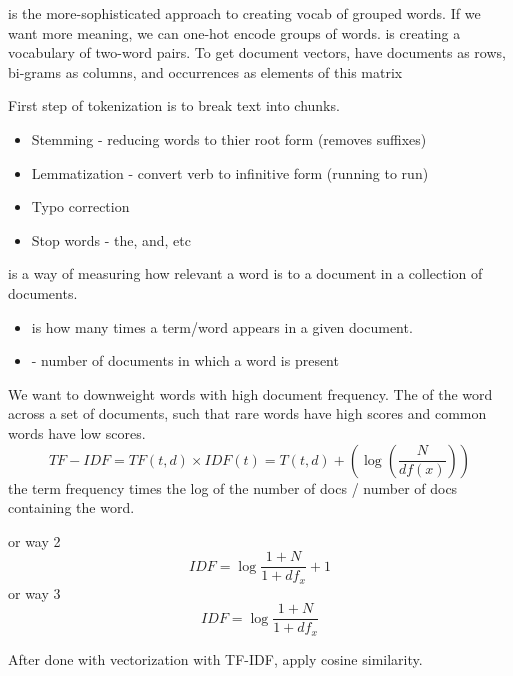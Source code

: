 \documentclass[12pt]{scrartcl}
\begin{document}
\begin{definition}
   is the more-sophisticated approach to creating vocab of grouped words. 
  If we want more meaning, we can one-hot encode groups of words.  is creating a vocabulary of 
  two-word pairs. To get document vectors, have documents as rows, bi-grams as columns, and occurrences as 
  elements of this matrix
\end{definition}

\begin{definition}
  First step of tokenization is to break text into chunks.
  \begin{itemize}
    \item Stemming - reducing words to thier root form (removes suffixes)
    \item Lemmatization - convert verb to infinitive form (running to run)
    \item Typo correction
    \item Stop words - the, and, etc
  \end{itemize}
\end{definition}

\begin{definition}
   is a way of measuring how relevant a word 
  is to a document in a collection of documents.
  \begin{itemize}
    \item {} is how many times a term/word appears in a given document.
    \item {} - number of documents in which a word is present 
  \end{itemize}
  We want to downweight words with high document frequency. The 
   of the word across a set of documents, such that 
  rare words have high scores and common words have low scores.
  \[TF-IDF = TF(t, d) \times IDF(t) = T(t, d) + (\log(\frac{N}{df(x)}))\]
  the term frequency times the log of the number of docs / number of docs containing the word.

  or way 2
  \[IDF = \log\frac{1 + N}{1 + df_x} + 1\]
  or way 3
  \[IDF = \log\frac{1 + N}{1 + df_x}\]
\end{definition}

\begin{note}
  After done with vectorization with TF-IDF, apply cosine similarity.
\end{note}
\end{document}
